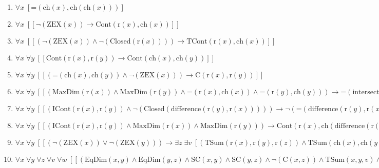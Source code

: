 \documentclass{article}
\begin{document}
\begin{enumerate}
\item $\forall x\;  \left[ \textrm{=}(\textrm{ch}(x),\textrm{ch}(\textrm{ch}(x))) \right]$
\item $\forall x\;  \left[ \left[ \neg \left(\textrm{ZEX}(x)\right) \rightarrow \textrm{Cont}(\textrm{r}(x),\textrm{ch}(x)) \right] \right]$
\item $\forall x\;  \left[ \left[ \left(\neg \left(\textrm{ZEX}(x)\right) \land \neg \left(\textrm{Closed}(\textrm{r}(x))\right)\right) \rightarrow \textrm{TCont}(\textrm{r}(x),\textrm{ch}(x)) \right] \right]$
\item $\forall x\; \forall y\;  \left[ \left[ \textrm{Cont}(\textrm{r}(x),\textrm{r}(y)) \rightarrow \textrm{Cont}(\textrm{ch}(x),\textrm{ch}(y)) \right] \right]$
\item $\forall x\; \forall y\;  \left[ \left[ \left(\textrm{=}(\textrm{ch}(x),\textrm{ch}(y)) \land \neg \left(\textrm{ZEX}(x)\right)\right) \rightarrow \textrm{C}(\textrm{r}(x),\textrm{r}(y)) \right] \right]$
\item $\forall x\; \forall y\;  \left[ \left[ \left(\textrm{MaxDim}(\textrm{r}(x)) \land \textrm{MaxDim}(\textrm{r}(y)) \land \textrm{=}(\textrm{r}(x),\textrm{ch}(x)) \land \textrm{=}(\textrm{r}(y),\textrm{ch}(y))\right) \rightarrow \textrm{=}(\textrm{intersection}(\textrm{ch}(x),\textrm{ch}(y)),\textrm{ch}(\textrm{intersection}(\textrm{ch}(x),\textrm{ch}(y)))) \right] \right]$
\item $\forall x\; \forall y\;  \left[ \left[ \left(\textrm{ICont}(\textrm{r}(x),\textrm{r}(y)) \land \neg \left(\textrm{Closed}(\textrm{difference}(\textrm{r}(y),\textrm{r}(x)))\right)\right) \rightarrow \neg \left(\textrm{=}(\textrm{difference}(\textrm{r}(y),\textrm{r}(x)),\textrm{ch}(\textrm{difference}(\textrm{r}(y),\textrm{r}(x))))\right) \right] \right]$
\item $\forall x\; \forall y\;  \left[ \left[ \left(\textrm{ICont}(\textrm{r}(x),\textrm{r}(y)) \land \textrm{MaxDim}(\textrm{r}(x)) \land \textrm{MaxDim}(\textrm{r}(y))\right) \rightarrow \textrm{Cont}(\textrm{r}(x),\textrm{ch}(\textrm{difference}(\textrm{r}(y),\textrm{r}(x)))) \right] \right]$
\item $\forall x\; \forall y\;  \left[ \left[ \left(\neg \left(\textrm{ZEX}(x)\right) \lor \neg \left(\textrm{ZEX}(y)\right)\right) \rightarrow \exists z\; \exists v\;  \left[ \left(\textrm{TSum}(\textrm{r}(x),\textrm{r}(y),\textrm{r}(z)) \land \textrm{TSum}(\textrm{ch}(x),\textrm{ch}(y),\textrm{r}(v)) \land \textrm{Cont}(v,\textrm{ch}(z))\right) \right] \right] \right]$
\item $\forall x\; \forall y\; \forall z\; \forall v\; \forall w\;  \left[ \left[ \left(\textrm{EqDim}(x,y) \land \textrm{EqDim}(y,z) \land \textrm{SC}(x,y) \land \textrm{SC}(y,z) \land \neg \left(\textrm{C}(x,z)\right) \land \textrm{TSum}(x,y,v) \land \textrm{TSum}(y,z,w) \land \textrm{=}(v,\textrm{ch}(v)) \land \textrm{=}(w,\textrm{ch}(w))\right) \rightarrow \textrm{=}(y,\textrm{ch}(y)) \right] \right]$

\end{enumerate}
\end{document}
